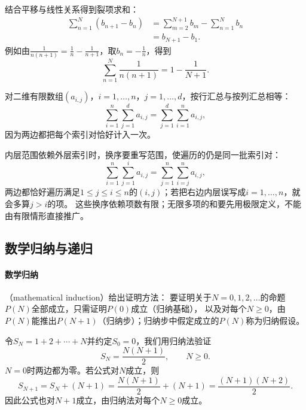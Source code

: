 结合平移与线性关系得到裂项求和：
\begin{equation}
 \begin{aligned}
  \sum_{n=1}^N(b_{n+1}-b_n)&=\sum_{m=2}^{N+1}b_m-\sum_{n=1}^{N}b_n\\
  &=b_{N+1}-b_1.
 \end{aligned}
 \label{eq:prelim-telescoping-sum}
\end{equation}
例如由$\frac1{n(n+1)}=\frac1n-\frac1{n+1}$，取$b_n=-\frac1n$，得到
\[
 \sum_{n=1}^N\frac1{n(n+1)}=1-\frac1{N+1}.
\]

对二维有限数组$(a_{i,j})$，$i=1,\ldots,n$，$j=1,\ldots,d$，按行汇总与按列汇总相等：
\begin{equation}
 \sum_{i=1}^{n}\sum_{j=1}^{d}a_{i,j}=\sum_{j=1}^{d}\sum_{i=1}^{n}a_{i,j},
 \label{eq:prelim-sum-interchange}
\end{equation}
因为两边都把每个索引对恰好计入一次。

内层范围依赖外层索引时，换序要重写范围，使遍历的仍是同一批索引对：
\begin{equation}
 \sum_{i=1}^{n}\sum_{j=1}^{i}a_{i,j}=\sum_{j=1}^{n}\sum_{i=j}^{n}a_{i,j},
 \label{eq:prelim-triangular-sum}
\end{equation}
两边都恰好遍历满足$1\leq j\leq i\leq n$的$(i,j)$；若把右边内层误写成$i=1,\ldots,n$，就会多算$j>i$的项。
这些换序依赖项数有限；无限多项的和要先用极限定义，不能由有限情形直接推广。

\subsection{数学归纳与递归}
\label{sec:prelim-recurrence-unrolling}

\paragraph{数学归纳}
（mathematical induction）给出证明方法：
要证明关于$N=0,1,2,\ldots$的命题$P(N)$全部成立，只需证明$P(0)$成立（归纳基础），
以及对每个$N\geq0$，由$P(N)$能推出$P(N+1)$（归纳步）；归纳步中假定成立的$P(N)$称为归纳假设。

\begin{example}[前$N$个正整数之和]
\label{ex:sets-induction-arithmetic-sum}
令$S_N=1+2+\cdots+N$并约定$S_0=0$，我们用归纳法验证
\[
 S_N=\frac{N(N+1)}2,\qquad N\geq0.
\]
$N=0$时两边都为零。若公式对$N$成立，则
\[
 S_{N+1}=S_N+(N+1)=\frac{N(N+1)}2+(N+1)=\frac{(N+1)(N+2)}2.
\]
因此公式也对$N+1$成立，由归纳法对每个$N\geq0$成立。
\end{example}

